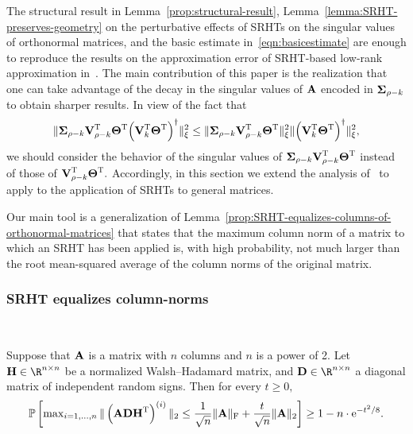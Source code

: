 The structural result in Lemma~\ref{prop:structural-result},
Lemma~\ref{lemma:SRHT-preserves-geometry} on the perturbative effects of SRHTs on the singular values of orthonormal matrices,
and the basic estimate in~\eqref{eqn:basicestimate} are enough to reproduce the results on the approximation error of SRHT-based low-rank approximation in~\cite{HMT}. The main contribution of this paper is the realization that one can take advantage of the decay in the singular values of ${\bm{\mathrm{A}}}$ encoded in ${\bm{\mathrm{\Sigma}}}_{\rho -k}$ to obtain sharper results. In view of the fact that
%
\begin{equation}
 \mbox{}\|{\bm{\mathrm{\Sigma}}}_{\rho - k} {\bm{\mathrm{V}}}_{\rho-k} ^{\textsc{T}} {\bm{\mathrm{\Theta}}}^{\textsc{T}} {\left( {\bm{\mathrm{V}}}_k ^{\textsc{T}} {\bm{\mathrm{\Theta}}}^{\textsc{T}} \right)}^\dagger\|_{\xi}^2 \leq \mbox{}\|{\bm{\mathrm{\Sigma}}}_{\rho - k} {\bm{\mathrm{V}}}_{\rho-k} ^{\textsc{T}} {\bm{\mathrm{\Theta}}}^{\textsc{T}}\|_{\xi}^2 \mbox{}\|{\left( {\bm{\mathrm{V}}}_k ^{\textsc{T}} {\bm{\mathrm{\Theta}}}^{\textsc{T}} \right)}^\dagger\|_{\xi}^2,
\end{equation}
%
we should consider the behavior of the singular values of ${\bm{\mathrm{\Sigma}}}_{\rho - k}{\bm{\mathrm{V}}}_{\rho-k} ^{\textsc{T}} {\bm{\mathrm{\Theta}}}^{\textsc{T}}$ instead of those of ${\bm{\mathrm{V}}}_{\rho-k} ^{\textsc{T}} {\bm{\mathrm{\Theta}}}^{\textsc{T}}.$ Accordingly, in this section we extend the analysis of~\cite{Tro11} to apply to the application of SRHTs to general matrices.

Our main tool is a generalization of Lemma~\ref{prop:SRHT-equalizes-columns-of-orthonormal-matrices} that states that the maximum column norm of a matrix to which an SRHT has been applied is, with high probability, not much larger than the root mean-squared average of the column norms of the original matrix.
\subsubsection{SRHT equalizes column-norms}
\
\begin{lemma}
\label{lemma:colnorm-tail-bound}
Suppose that ${\bm{\mathrm{A}}}$ is a matrix with $n$ columns and $n$ is a power of 2. Let $\matH \in \R^{n \times n}$ be a normalized Walsh--Hadamard matrix, and $\matD \in \R^{n \times n}$ a diagonal matrix of independent random signs. Then for every $t \geq 0,$
\[
 \mbox{}{\mathbb{P}}\left[    \max\nolimits_{i=1,...,n} \mbox{}\| \left({\bm{\mathrm{A}}} {\bm{\mathrm{D}}} {\bm{\mathrm{H}}}^{\textsc{T}} \right)^{(i)}\|_2   \leq {1\over \sqrt{n} } \mbox{}\|{\bm{\mathrm{A}}}\|_\mathrm{F} + {t\over \sqrt{n}} \mbox{}\|{\bm{\mathrm{A}}}\|_2 \right] \geq 1 - n \cdot {\mathrm e}^{-t^2/8}.
\]
\end{lemma}

